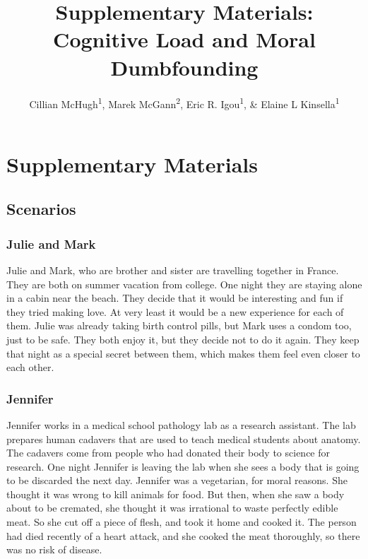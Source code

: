 \documentclass[
  american,
  man,floatsintext]{apa7}
\title{Supplementary Materials: Cognitive Load and Moral Dumbfounding}
\author{Cillian McHugh\textsuperscript{1}, Marek McGann\textsuperscript{2}, Eric R. Igou\textsuperscript{1}, \& Elaine L Kinsella\textsuperscript{1}}
\date{}
\affiliation{\vspace{0.5cm}\textsuperscript{1} University of Limerick\\\textsuperscript{2} Mary Immaculate College \textasciitilde{} University of Limerick}
\begin{document}
\maketitle

\hypertarget{supplementary-materials}{%
\section{Supplementary Materials}\label{supplementary-materials}}

\hypertarget{scenarios}{%
\subsection{Scenarios}\label{scenarios}}

\hypertarget{julie-and-mark}{%
\subsubsection{Julie and Mark}\label{julie-and-mark}}

Julie and Mark, who are brother and sister are travelling together in France. They are both on summer vacation from college. One night they are staying alone in a cabin near the beach. They decide that it would be interesting and fun if they tried making love. At very least it would be a new experience for each of them. Julie was already taking birth control pills, but Mark uses a condom too, just to be safe. They both enjoy it, but they decide not to do it again. They keep that night as a special secret between them, which makes them feel even closer to each other.

\hypertarget{jennifer}{%
\subsubsection{Jennifer}\label{jennifer}}

Jennifer works in a medical school pathology lab as a research assistant. The lab prepares human cadavers that are used to teach medical students about anatomy. The cadavers come from people who had donated their body to science for research. One night Jennifer is leaving the lab when she sees a body that is going to be discarded the next day. Jennifer was a vegetarian, for moral reasons. She thought it was wrong to kill animals for food. But then, when she saw a body about to be cremated, she thought it was irrational to waste perfectly edible meat. So she cut off a piece of flesh, and took it home and cooked it. The person had died recently of a heart attack, and she cooked the meat thoroughly, so there was no risk of disease.
\end{document}
